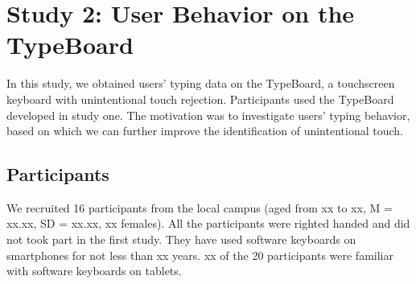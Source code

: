 \section{Study 2: User Behavior on the TypeBoard}

In this study, we obtained users' typing data on the TypeBoard, a touchscreen keyboard with unintentional touch rejection. Participants used the TypeBoard developed in study one. The motivation was to investigate users' typing behavior, based on which we can further improve the identification of unintentional touch.


\subsection{Participants}

We recruited 16 participants from the local campus (aged from xx to xx, M = xx.xx, SD = xx.xx, xx females). All the participants were righted handed and did not took part in the first study. They have used software keyboards on smartphones for not less than xx years. xx of the 20 participants were familiar with software keyboards on tablets.



